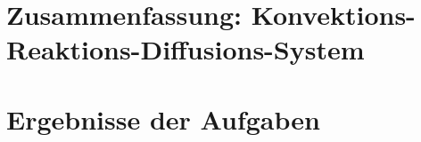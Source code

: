 \documentclass[12pt,a4paper]{scrartcl}
\numberwithin{equation}{section}
\begin{document}


\tableofcontents

\section{Zusammenfassung: Konvektions-Reaktions-Diffusions-System}

\newpage
\section{Ergebnisse der Aufgaben}
%
\end{document}
